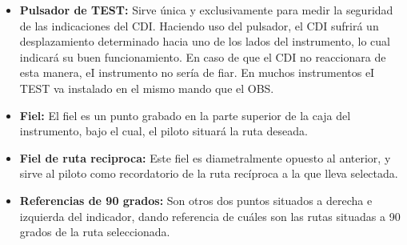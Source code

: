 \begin{itemize}
\item \textbf{Pulsador de TEST:} Sirve única y exclusivamente para medir la seguridad de las indicaciones del CDI. Haciendo uso del pulsador, el CDI sufrirá un desplazamiento determinado hacia uno de los lados del instrumento, lo cual indicará su buen funcionamiento. En caso de que el CDI no reaccionara de esta manera, eI instrumento no sería de fiar. En muchos instrumentos eI TEST va instalado en el mismo mando que el OBS.

\item \textbf{Fiel:} El fiel es un punto grabado en la parte superior de la caja del instrumento, bajo el cual, el piloto situará la ruta deseada.

\item \textbf{Fiel de ruta reciproca:} Este fiel es diametralmente opuesto al anterior, y sirve al piloto como recordatorio de la ruta recíproca a la que lleva selectada.

\item \textbf{Referencias de 90 grados:} Son otros dos puntos situados a derecha e izquierda del indicador, dando referencia de cuáles son las rutas situadas a 90 grados de la ruta seleccionada.


\end{itemize}